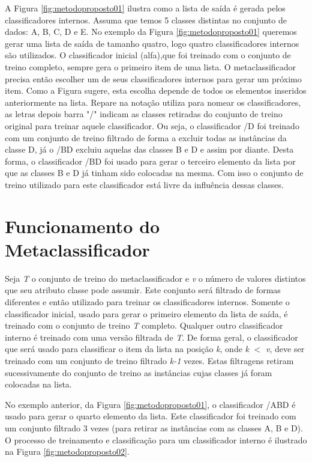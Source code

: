 A Figura \ref{fig:metodoproposto01} ilustra como a lista de saída é gerada pelos classificadores internos.
Assuma que temos 5 classes distintas no conjunto de dados: A, B, C, D e E. 
No exemplo da Figura \ref{fig:metodoproposto01} queremos gerar uma lista de saída de tamanho quatro, logo quatro classificadores internos são utilizados. 
O classificador inicial (alfa),que foi treinado com o conjunto de treino completo, sempre gera o primeiro item de uma lista. 
O metaclassificador precisa então escolher um de seus classificadores internos para gerar um próximo item. 
Como a Figura sugere, esta escolha depende de todos os elementos inseridos anteriormente na lista.
Repare na notação utiliza para nomear os classificadores, as letras depois barra "/" indicam as classes retiradas do conjunto de treino original para treinar aquele classificador.
Ou seja, o classificador /D foi treinado com um conjunto de treino filtrado de forma a excluir todas as instâncias da classe D, já o /BD excluiu aquelas das classes B e D e assim por diante.
Desta forma, o classificador /BD foi usado para gerar o terceiro elemento da lista por que as classes B e D já tinham sido colocadas na mesma.
Com isso o conjunto de treino utilizado para este classificador está livre da influência dessas classes.

\section{Funcionamento do Metaclassificador}

Seja \textit{T} o conjunto de treino do metaclassificador e \textit{v} o número de valores distintos que seu atributo classe pode assumir. 
Este conjunto será filtrado de formas diferentes e então utilizado para treinar os classificadores internos. 
Somente o classificador inicial, usado para gerar o primeiro elemento da lista de saída, é treinado com o conjunto de treino \textit{T} completo. 
Qualquer outro classificador interno é treinado com uma versão filtrada de  \textit{T}. 
De forma geral, o classificador que será usado para classificar o item da lista na posição \textit{k}, onde \textit{k} $<$ \textit{v}, deve ser treinado com um conjunto de treino filtrado \textit{k-1} vezes. 
Estas filtragens retiram sucessivamente do conjunto de treino as instâncias cujas classes já foram colocadas na lista.

No exemplo anterior, da Figura \ref{fig:metodoproposto01}, o classificador /ABD é usado para gerar o quarto elemento da lista.
Este classificador foi treinado com um conjunto filtrado 3 vezes (para retirar as instâncias com as classes A, B e D).
O processo de treinamento e classificação para um classificador interno é ilustrado na Figura \ref{fig:metodoproposto02}.

